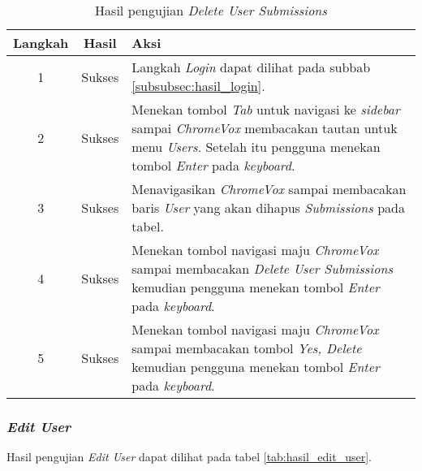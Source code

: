 \begin{table}[H]
	\centering
	\caption{Hasil pengujian \textit{Delete User Submissions}}
	\label{tab:hasil_delete_user_submissions}
	\begin{tabular}{|c|c|p{12cm}|}
		\toprule
		Langkah & Hasil & Aksi\\
		\midrule
		1 & Sukses & Langkah \textit{Login} dapat dilihat pada subbab \ref{subsubsec:hasil_login}.\\
		2 & Sukses & Menekan tombol \textit{Tab} untuk navigasi ke \textit{sidebar} sampai \textit{ChromeVox} membacakan tautan untuk menu \textit{Users}. Setelah itu pengguna menekan tombol \textit{Enter} pada \textit{keyboard}.\\
		3 & Sukses & Menavigasikan \textit{ChromeVox} sampai membacakan baris \textit{User} yang akan dihapus \textit{Submissions} pada tabel.\\
		4 & Sukses & Menekan tombol navigasi maju \textit{ChromeVox} sampai membacakan \textit{Delete User Submissions} kemudian pengguna menekan tombol \textit{Enter} pada \textit{keyboard}.\\
		5 & Sukses & Menekan tombol navigasi maju \textit{ChromeVox} sampai membacakan tombol \textit{Yes, Delete} kemudian pengguna menekan tombol \textit{Enter} pada \textit{keyboard}.\\
		\bottomrule
	\end{tabular}
\end{table}

\subsubsection{\textit{Edit User}}
\label{subsubsec:hasil_edit_user}
Hasil pengujian \textit{Edit User} dapat dilihat pada tabel \ref{tab:hasil_edit_user}.

